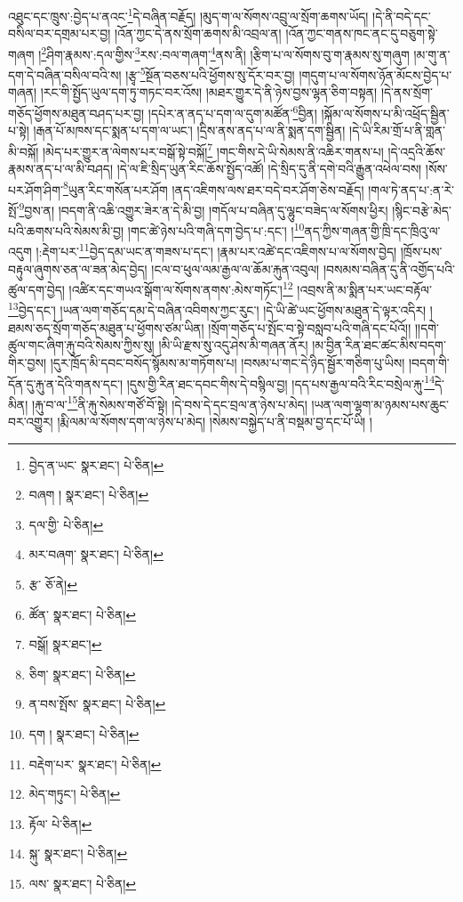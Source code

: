 འཐུང་དང་ཁྲུས་:བྱེད་པ་ནའང་\footnote{བྱེད་ན་ཡང་  སྣར་ཐང་།  པེ་ཅིན། }དེ་བཞིན་བརྗོད། །མུད་ག་ལ་སོགས་འབྲུ་ལ་སྲོག་ཆགས་ཡོད། །དེ་ནི་བདེ་དང་བསིལ་བར་དགྲམ་པར་བྱ། །འོན་ཀྱང་དེ་ནས་སྲོག་ཆགས་མི་འབྲལ་ན། །འོན་ཀྱང་གནས་ཁང་ནང་དུ་བཅུག་སྟེ་གཞག །\footnote{བཞག །  སྣར་ཐང་།  པེ་ཅིན། }ཤིག་རྣམས་:དལ་གྱིས་\footnote{དལ་གྱི་  པེ་ཅིན། }རས་:བལ་གཞག་\footnote{མར་བཞག་  སྣར་ཐང་།  པེ་ཅིན། }ནས་ནི། །རྩིག་པ་ལ་སོགས་བུ་ག་རྣམས་སུ་གཞུག །མ་གུ་ན་དག་དེ་བཞིན་བསིལ་བའི་ས། །རྩྭ་\footnote{རྩ་  ཅོ་ནེ། }སྔོན་བཅས་པའི་ཕྱོགས་སུ་དོར་བར་བྱ། །གདུག་པ་ལ་སོགས་ཉོན་མོངས་བྱེད་པ་གཞན། །རང་གི་སྤྱོད་ཡུལ་དག་ཏུ་གཏང་བར་འོས། །མཐར་གྱུར་དེ་ནི་ཉེས་བྱས་ལྷན་ཅིག་བསྟན། །དེ་ནས་སྲོག་གཅོད་ཕྱོགས་མཐུན་བཤད་པར་བྱ། །དཔེར་ན་ནད་པ་དག་ལ་དུག་མཚོན་\footnote{ཚོན་  སྣར་ཐང་།  པེ་ཅིན། }བྱིན། །སྐོམ་ལ་སོགས་པ་མི་འཕྲོད་སྦྱིན་པ་སྟེ། །རྒན་པོ་མཁས་དང་སྨན་པ་དག་ལ་ཡང་། །དྲིས་ནས་ནད་པ་ལ་ནི་སྨན་དག་སྦྱིན། །དེ་ཡི་རིམ་གྲོ་པ་ནི་གླན་མི་བསྐོ། །མེད་པར་གྱུར་ན་ལེགས་པར་བསྒོ་སྟེ་བསྐོ།\footnote{བསྒོ།  སྣར་ཐང་། } །གང་གིས་དེ་ཡི་སེམས་ནི་འཆིར་གནས་པ། །དེ་འདྲའི་ཆོས་རྣམས་ནད་པ་ལ་མི་བཤད། །དེ་ལ་ཇི་སྲིད་ཡུན་རིང་ཆོས་སྤྱོད་འཚོ། །དེ་སྲིད་དུ་ནི་དགེ་བའི་རྒྱུན་འཕེལ་བས། །སོས་པར་ཤོག་ཤིག་\footnote{ཅིག་  སྣར་ཐང་།  པེ་ཅིན། }ཡུན་རིང་གསོན་པར་ཤོག །ནད་འཇིགས་ལས་ཐར་བདེ་བར་ཤོག་ཅེས་བརྗོད། །གལ་ཏེ་ནད་པ་:ན་རེ་སྤོ་\footnote{ན་བས་སྤོས་  སྣར་ཐང་།  པེ་ཅིན། }བྱས་ན། །བདག་ནི་འཆི་འགྱུར་ཟེར་ན་དེ་མི་བྱ། །གདོལ་པ་བཞིན་དུ་ལྷུང་བཟེད་ལ་སོགས་ཕྱིར། །སྙིང་བརྩེ་མེད་པའི་ཆགས་པའི་སེམས་མི་བྱ། །གང་ཚེ་ཉེས་པའི་གཞི་དག་བྱེད་པ་:དང་། །\footnote{དག །  སྣར་ཐང་།  པེ་ཅིན། }ནད་ཀྱིས་གཞན་གྱི་ཁྲི་དང་ཁྲིའུ་ལ་འདུག །:རྡེག་པར་\footnote{བརྡེག་པར་  སྣར་ཐང་།  པེ་ཅིན། }བྱེད་དམ་ཡང་ན་གཟས་པ་དང་། །རྣམ་པར་འཚེ་དང་འཇིགས་པ་ལ་སོགས་བྱེད། །ཁྲོས་པས་བརྟུལ་ཞུགས་ཅན་ལ་ཟན་མེད་བྱེད། །ངལ་བ་ཕུལ་ལམ་རྒྱལ་ལ་ཆོམ་རྐུན་འབུལ། །བསམས་བཞིན་དུ་ནི་འགྱོད་པའི་ཚུལ་དག་བྱེད། །འཚིར་དང་གཡའ་སྒོག་ལ་སོགས་ནགས་:མེས་གཏོང་།\footnote{མེད་གཏུང་།  པེ་ཅིན། } །འབྲས་ནི་མ་སྨིན་པར་ཡང་བརྟོལ་\footnote{རྟོལ་  པེ་ཅིན། }བྱེད་དང་། །ཡན་ལག་གཅོད་དམ་དེ་བཞིན་འབིགས་ཀྱང་རུང་། །དེ་ཡི་ཚེ་ཡང་ཕྱོགས་མཐུན་དེ་ལྟར་འདིར། །ཐམས་ཅད་སྲོག་གཅོད་མཐུན་པ་ཕྱོགས་ཙམ་ཡིན། །སྲོག་གཅོད་པ་སྤོང་བ་སྟེ་བསླབ་པའི་གཞི་དང་པོའོ།། །།དགེ་ཚུལ་གང་ཞིག་རྐུ་བའི་སེམས་ཀྱིས་སུ། །མི་ཡི་རྫས་སུ་འདུ་ཤེས་མི་གཞན་ནོར། །མ་བྱིན་རིན་ཐང་ཚང་མིས་བདག་གིར་བྱས། །དུར་ཁྲོད་མི་དབང་བསོད་སྙོམས་མ་གཏོགས་པ། །བསམ་པ་གང་དེ་ཉིད་སྦྱོར་གཅིག་པུ་ཡིས། །བདག་གི་དོན་དུ་རྐུ་ན་དེའི་གནས་དང་། །དུས་གྱི་རིན་ཐང་དབང་གིས་དེ་བསྙིལ་བྱ། །དད་པས་རྒྱལ་བའི་རིང་བསྲེལ་རྐུ་\footnote{སྐུ་  སྣར་ཐང་།  པེ་ཅིན། }དེ་མིན། །རྐུ་བ་ལ་\footnote{ལས་  སྣར་ཐང་།  པེ་ཅིན། }ནི་རྐུ་སེམས་གཙོ་བོ་སྟེ། །དེ་བས་དེ་དང་བྲལ་ན་ཉེས་པ་མེད། །ཡན་ལག་ལྷག་མ་ཉམས་པས་ཆུང་བར་འགྱུར། །རྨི་ལམ་ལ་སོགས་དག་ལ་ཉེས་པ་མེད། །སེམས་བསྐྱེད་པ་ནི་བསྡམ་བྱ་དང་པོ་ཡི། །
